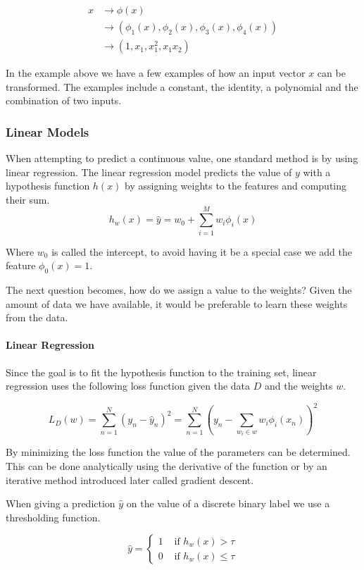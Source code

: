 \begin{align*}
x &\rightarrow \phi(x) \\
&\rightarrow (\phi_1(x), \phi_2(x), \phi_3(x), \phi_4(x)) \\
&\rightarrow (1, x_1, x_1^2, x_1x_2)
\end{align*} 

In the example above we have a few examples of how an input vector $x$ can be transformed.
The examples include a constant, the identity, a polynomial and the combination of two inputs.

\subsubsection{Linear Models}

When attempting to predict a continuous value, one standard method is by using linear regression.
The linear regression model predicts the value of $y$ with a hypothesis function $h(x)$ by assigning weights to the features and computing their sum.
$$h_w(x) = \hat{y} = w_0 + \sum_{i=1}^M w_i \phi_i(x)$$ 

Where $w_0$ is called the intercept, to avoid having it be a special case we add the feature $\phi_0(x)=1$.

The next question becomes, how do we assign a value to the weights?
Given the amount of data we have available, it would be preferable to learn these weights from the data. 

\paragraph{Linear Regression}
Since the goal is to fit the hypothesis function to the training set, linear regression uses the following loss function given the data $D$ and the weights $w$.

$$ L_D(w) = \sum_{n=1}^N (y_n-\hat{y}_n)^2 = \sum_{n=1}^N (y_n - \sum_{w_i \in w} w_i \phi_i(x_n))^2 $$ 
    
By minimizing the loss function the value of the parameters can be determined.
This can be done analytically using the derivative of the function or by an iterative method introduced later called gradient descent.

When giving a prediction $\hat{y}$ on the value of a discrete binary label we use a thresholding function.

$$\hat{y} = \begin{cases}
	1 &\text{ if } h_w(x) > \tau \\
	0 &\text{ if } h_w(x) \leq \tau  %
\end{cases}$$ 

